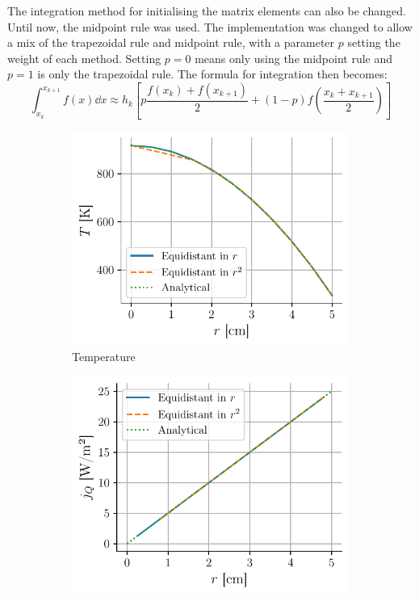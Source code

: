 The integration method for initialising the matrix elements can also be changed. Until now, the midpoint rule was used. The implementation was changed to allow a mix of the trapezoidal rule and midpoint rule, with a parameter \(p\) setting the weight of each method. Setting \(p = 0\) means only using the midpoint rule and \(p = 1\) is only the trapezoidal rule. The formula for integration then becomes:
\begin{equation}
    \int_{x_k}^{x_{k+1}} f(x) \dd x \approx h_k \left[ p \frac{f(x_k) + f(x_{k+1})}{2} + (1-p) f \left( \frac{x_k + x_{k+1}}{2} \right) \right]
\end{equation}
\begin{figure}[h]
    \centering
    \begin{subfigure}{0.5\linewidth}
        \centering
        \includegraphics[width=\linewidth]{figures/temperature_exact.pdf}
        \caption{Temperature}
        \label{fig:temperature_exact}
    \end{subfigure}
    \begin{subfigure}{0.48\linewidth}
        \centering
        \includegraphics[width=\linewidth]{figures/heat_exact.pdf}

\end{subfigure}
\end{figure}
